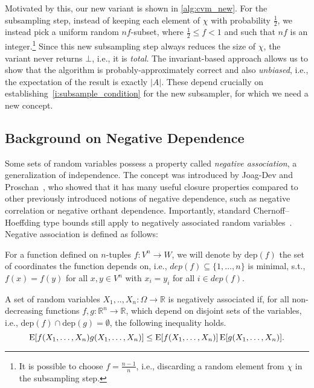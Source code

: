 Motivated by this, our new variant is shown in \cref{alg:cvm_new}.
For the subsampling step, instead of keeping each element of $\chi$ with probability $\frac{1}{2}$, we instead pick a uniform random $nf$-subset, where $\frac{1}{2} \leq f < 1$ and such that $nf$ is an integer.\footnote{It is possible to choose $f = \frac{n-1}{n}$, i.e., discarding a random element from $\chi$ in the subsampling step.}
Since this new subsampling step always reduces the size of $\chi$, the variant never returns $\bot$, i.e., it is \emph{total}.
The invariant-based approach allows us to show that the algorithm is probably-approximately correct and also \emph{unbiased}, i.e., the expectation of the result is exactly $|A|$.
These depend crucially on establishing~\cref{i:subsample_condition} for the new subsampler, for which we need a new concept.

\subsection{Background on Negative Dependence}
Some sets of random variables possess a property called \emph{negative association}, a generalization of independence.
The concept was introduced by Joag-Dev and Proschan~\cite{joagdev1983}, who showed that it has many useful closure properties compared to other previously introduced notions of negative dependence, such as negative correlation or negative orthant dependence.
Importantly, standard Chernoff--Hoeffding type bounds still apply to negatively associated random variables~\cite[Prop. 7]{dubhashi1998}.
Negative association is defined as follows:
\begin{definition}
For a function defined on $n$-tuples $f: V^n \rightarrow W$, we will denote by $\mathrm{dep}(f)$ the set of coordinates the function depends on, i.e., $dep(f) \subseteq \{1,\ldots,n\}$ is minimal, s.t., $f(x) = f(y)$ for all $x, y \in V^n$ with $x_i = y_i$ for all $i \in dep(f)$.
\end{definition}

\begin{definition}\label{def:neg_assoc}
A set of random variables $X_1,..,X_n: \Omega \rightarrow \mathbb R$ is negatively associated if, for all non-decreasing functions $f,g: \mathbb R^n \rightarrow \mathbb R$, which depend on disjoint sets of the variables, i.e., $\mathrm{dep}(f) \cap \mathrm{dep}(g) = \emptyset$, the following inequality holds.
\[
\operatorname{\mathrm{E}} [f(X_1,\ldots,X_n) g(X_1,\ldots,X_n)] \leq \operatorname{\mathrm{E}} [f(X_1,\ldots,X_n)] \operatorname{\mathrm{E}} [g(X_1,\ldots,X_n)] \textrm{.}
\]
\end{definition}

